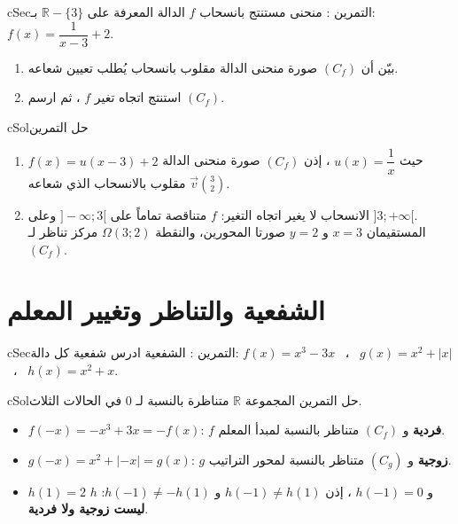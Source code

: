 \documentclass[12pt,a4paper]{article}
\newenvironment{BOX}[2]{\begin{otherlanguage}{english}\begin{arbox}{#1}{#2}}{\end{arbox}\end{otherlanguage}}
\newcounter{exo}
\newenvironment{tamrin}[1]{\stepcounter{exo}\begin{BOX}{cSec}{التمرين \theexo: #1}}{\end{BOX}}
\newenvironment{hal}{\Needspace{12\baselineskip}\begin{otherlanguage}{english}\begin{arbox}[breakable]{cSol}{حل التمرين \theexo}}{\end{arbox}\end{otherlanguage}}
\newenvironment{LTR}{\begin{otherlanguage}{english}}{\end{otherlanguage}}
\newcommand{\R}{\mathbb{R}}
\newcommand{\Grid}[4]{%
 \draw[gray!25] (#1,#3) grid (#2,#4);
 \draw[-{Stealth}] (#1-0.2,0)--(#2+0.3,0) node[below]{$x$};
 \draw[-{Stealth}] (0,#3-0.2)--(0,#4+0.3) node[left]{$y$};
 \node[below left,font=\scriptsize] at (0,0){$O$};}
\begin{document}
\begin{tamrin}{منحنى مستنتج بانسحاب}
$f$ الدالة المعرفة على $\R-\{3\}$ بـ: $f(x)=\dfrac{1}{x-3}+2$.
\begin{enumerate}
\item بيّن أن $(C_f)$ صورة منحنى الدالة مقلوب بانسحاب يُطلب تعيين شعاعه.
\item استنتج اتجاه تغير $f$ ، ثم ارسم $(C_f)$.
\end{enumerate}
\end{tamrin}
\begin{hal}
\begin{minipage}{0.55\textwidth}
\begin{enumerate}
\item $f(x)=u(x-3)+2$ حيث $u(x)=\dfrac1x$ ، إذن $(C_f)$ صورة منحنى الدالة مقلوب بالانسحاب الذي شعاعه $\boxed{\vec v\binom{3}{2}}$.
\item الانسحاب لا يغير اتجاه التغير: $f$ متناقصة تماماً على $]-\infty;3[$ وعلى $]3;+\infty[$.\\
المستقيمان $x=3$ و $y=2$ صورتا المحورين، والنقطة $\Omega(3;2)$ مركز تناظر لـ $(C_f)$.
\end{enumerate}
\end{minipage}\hfill
\begin{minipage}{0.42\textwidth}
\centering
\begin{LTR}
\end{LTR}
\end{minipage}
\end{hal}

\section{الشفعية والتناظر وتغيير المعلم}
\begin{tamrin}{الشفعية}
ادرس شفعية كل دالة: \quad $f(x)=x^3-3x$ \ ، \ $g(x)=x^2+|x|$ \ ، \ $h(x)=x^2+x$.
\end{tamrin}
\begin{hal}
المجموعة $\R$ متناظرة بالنسبة لـ $0$ في الحالات الثلاث.
\begin{itemize}
\item $f(-x)=-x^3+3x=-f(x)$: $f$ \textbf{فردية} و $(C_f)$ متناظر بالنسبة لمبدأ المعلم.
\item $g(-x)=x^2+|-x|=g(x)$: $g$ \textbf{زوجية} و $(C_g)$ متناظر بالنسبة لمحور التراتيب.
\item $h(1)=2$ و $h(-1)=0$ ، إذن $h(-1)\ne h(1)$ و $h(-1)\ne-h(1)$: $h$ \textbf{ليست زوجية ولا فردية}.
\end{itemize}
\end{hal}
\end{document}
